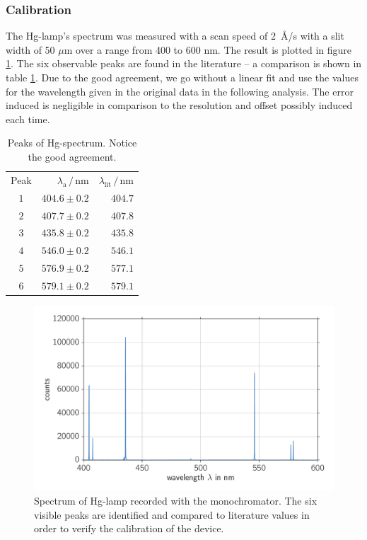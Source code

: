 \subsubsection{Calibration}
The Hg-lamp's spectrum was measured with a scan speed of 2~\AA/s with a slit width of 50 $\mu$m over a range from 400 to 
600 nm. The result is plotted in figure \ref{fig:mono_calibration_hg}. The six observable peaks are found in the
literature -- a comparison is shown in table \ref{tab:mono_calibration}. Due to the good agreement, we go without a linear 
fit and use the values for the wavelength given in the original data in the following analysis. The error induced is 
negligible in comparison to the resolution and offset possibly induced each time. 
\begin{table}[htpb]
    \centering
    \caption{
        Peaks of Hg-spectrum. Notice the good agreement. 
        }
    \label{tab:mono_calibration}
    \begin{tabular}{c r r}
        \rowcolor{LightCyan} Peak & $\lambda_\text{a} \,/\, \text{nm}$ & $\lambda_\text{lit} \,/\, \text{nm}$ \\
        \cellcolor{LightCyan}$1$ & $404.6 \pm 0.2$ & $404.7$   \\
        \cellcolor{LightCyan}$2$ & $407.7 \pm 0.2$ & $407.8$   \\
        \cellcolor{LightCyan}$3$ & $435.8 \pm 0.2$ & $435.8$   \\
        \cellcolor{LightCyan}$4$ & $546.0 \pm 0.2$ & $546.1$   \\
        \cellcolor{LightCyan}$5$ & $576.9 \pm 0.2$ & $577.1$   \\
        \cellcolor{LightCyan}$6$ & $579.1 \pm 0.2$ & $579.1$ 
    \end{tabular}
\end{table}
\begin{figure}[htpb]
    \centering
    \includegraphics[width=0.8\linewidth]{analysis/figures/mono_calibration_hg}
    \caption{Spectrum of Hg-lamp recorded with the monochromator. The six visible peaks are identified and compared 
    to literature values in order to verify the calibration of the device.}
    \label{fig:mono_calibration_hg}
\end{figure}


